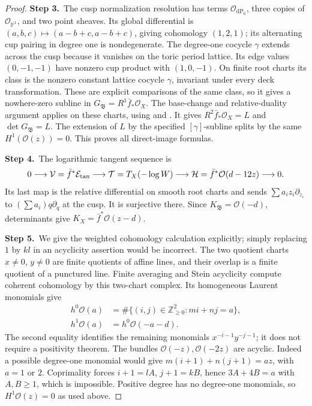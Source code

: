 \documentclass[11pt,a4paper]{article}
\theoremstyle{plain}
\theoremstyle{definition}
\begin{document}
\begin{proof}
\par\smallskip\noindent\textbf{Step 3.}\ The cusp normalization resolution has terms
$\mathcal O_{\mathrm{dP}_6}$, three copies of
$\mathcal O_{\mathbb P^1}$, and two point sheaves.
Its global differential is $(a,b,c)\mapsto
(a-b+c,a-b+c)$, giving cohomology $(1,2,1)$; its alternating cup
pairing in degree one is nondegenerate.  The degree-one cocycle
$\gamma$ extends across the cusp because it vanishes on the toric
period lattice.  Its edge values $(0,-1,-1)$ have nonzero cup
product with $(1,0,-1)$.  On finite root charts its class is the
nonzero constant lattice cocycle $\gamma$, invariant under every
deck transformation.  These are explicit comparisons of the
same class, so it gives a nowhere-zero subline in
$G_{\mathfrak B}=R^1\bar f_*\mathcal O_X$.
The base-change and relative-duality argument applies on these charts, using \cite[III.4.12]{BS76} and \cite[pp.~264--266]{RRV71}.  It gives $R^2\bar f_*\mathcal O_X=L$ and
$\det G_{\mathfrak B}=L$.  The extension of $L$ by the specified
$[\gamma]$-subline splits by the same $H^1(\mathcal O(z))=0$.
This proves all direct-image formulas.

\par\smallskip\noindent\textbf{Step 4.}\ The logarithmic tangent sequence is
\[
 0\longrightarrow\mathcal V=\bar f^*\mathcal E_{\rm tan}
 \longrightarrow\mathcal T=T_X(-\log W)
 \longrightarrow\mathcal H=\bar f^*\mathcal O(d-12z)
 \longrightarrow0.
\]
Its last map is the relative differential on smooth root charts
and sends $\sum a_i z_i\partial_{z_i}$ to
$(\sum a_i)q\partial_q$ at the cusp.  It is surjective there.
Since $K_{\mathfrak B}=\mathcal O(-d)$, determinants give
$K_X=\bar f^*\mathcal O(z-d)$.

\par\smallskip\noindent\textbf{Step 5.}\ We give the weighted cohomology calculation explicitly; simply
replacing $1$ by $kl$ in an acyclicity assertion would be incorrect.
The two quotient charts $x\ne0$, $y\ne0$ are finite quotients
of affine lines, and their overlap is a finite quotient of a
punctured line.  Finite averaging and Stein acyclicity compute
coherent cohomology by this two-chart complex.  Its homogeneous
Laurent monomials give
\[
 \begin{split}
 h^0\mathcal O(a)&=\#\{(i,j)\in\mathbb Z_{\ge0}^2:mi+nj=a\},\\
 h^1\mathcal O(a)&=h^0\mathcal O(-a-d).
 \end{split}
\]
The second equality identifies the remaining monomials
$x^{-i-1}y^{-j-1}$; it does not require a positivity theorem.
The bundles $\mathcal O(-z),\mathcal O(-2z)$ are acyclic.
Indeed a possible degree-one monomial would give
$m(i+1)+n(j+1)=az$, with $a=1$ or $2$.
Coprimality forces $i+1=lA$, $j+1=kB$, hence
$3A+4B=a$ with $A,B\ge1$, which is impossible.
Positive degree has no degree-one monomials, so
$H^1\mathcal O(z)=0$ as used above.


\end{proof}
\end{document}
